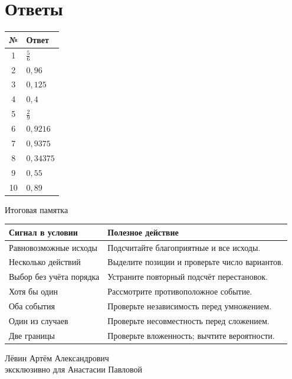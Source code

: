\documentclass[a4paper,12pt]{article}
\begin{document}
\section*{Ответы}
\begin{center}
\begin{tabular}{@{}cl@{}}
\toprule
\textbf{№} & \textbf{Ответ}\\
\midrule
1 & $\frac56$\\
2 & $0,96$\\
3 & $0,125$\\
4 & $0,4$\\
5 & $\frac29$\\
6 & $0,9216$\\
7 & $0,9375$\\
8 & $0,34375$\\
9 & $0,55$\\
10 & $0,89$\\
\bottomrule
\end{tabular}
\end{center}
\vspace{8mm}
\begin{center}\large\textcolor{darkaccent}{Итоговая памятка}\end{center}
\begin{tabularx}{\linewidth}{@{}p{.37\linewidth}X@{}}
\toprule
\textbf{Сигнал в условии} & \textbf{Полезное действие}\\
\midrule
Равновозможные исходы & Подсчитайте благоприятные и все исходы.\\
Несколько действий & Выделите позиции и проверьте число вариантов.\\
Выбор без учёта порядка & Устраните повторный подсчёт перестановок.\\
Хотя бы один & Рассмотрите противоположное событие.\\
Оба события & Проверьте независимость перед умножением.\\
Один из случаев & Проверьте несовместность перед сложением.\\
Две границы & Проверьте вложенность; вычтите вероятности.\\
\bottomrule
\end{tabularx}
\vfill
\begin{center}\small Лёвин Артём Александрович\\эксклюзивно для Анастасии Павловой\end{center}
\end{document}
